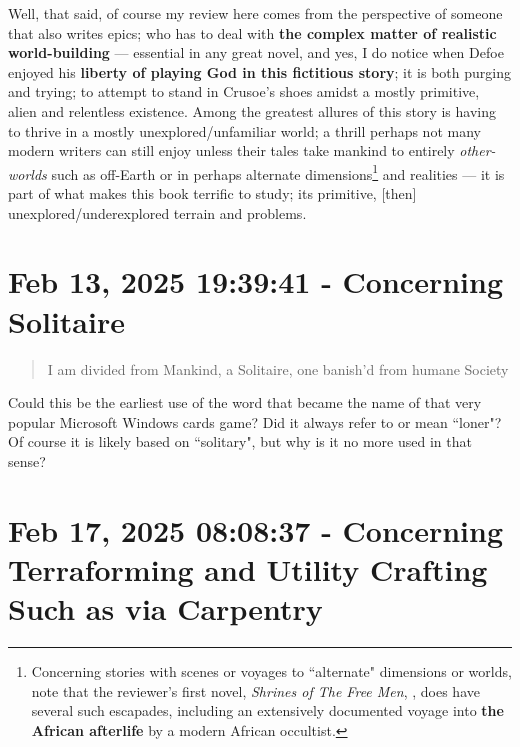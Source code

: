 \documentclass[a4paper]{article}
\begin{document}
Well, that said, of course my review here comes from the perspective of someone that also writes epics; who has to deal with \textbf{the complex matter of realistic world-building} --- essential in any great novel, and yes, I do notice when Defoe enjoyed his \textbf{liberty of playing God in this fictitious story}; it is both purging and trying; to attempt to stand in Crusoe's shoes amidst a mostly primitive, alien and relentless existence. Among the greatest allures of this story is having to thrive in a mostly unexplored/unfamiliar world; a thrill perhaps not many modern writers can still enjoy unless their tales take mankind to entirely \textit{other-worlds} such as off-Earth or in perhaps alternate dimensions\footnote{Concerning stories with scenes or voyages to ``alternate" dimensions or worlds, note that the reviewer's first novel, \textit{Shrines of The Free Men}, \cite{shrinesjwl}, does have several such escapades, including an extensively documented voyage into \textbf{the African afterlife} by a modern African occultist.} and realities --- it is part of what makes this book terrific to study; its primitive, [then] unexplored/underexplored terrain and problems.





\section{Feb 13, 2025 19:39:41  - Concerning Solitaire}
\label{SEC14}



\noindent
\begin{minipage}{1\textwidth}
\vspace{1em}
\begin{quotation}
{\ttfamily


I am divided from Mankind, a Solitaire, one banish’d from humane Society


}
\end{quotation}
\vspace{1em}
\end{minipage}


Could this be the earliest use of the word that became the name of that very popular Microsoft Windows cards game? Did it always refer to or mean ``loner"? Of course it is likely based on ``solitary", but why is it no more used in that sense?




\section{Feb 17, 2025 08:08:37 - Concerning Terraforming and Utility Crafting Such as via Carpentry}
\label{SEC15}
\end{document}
